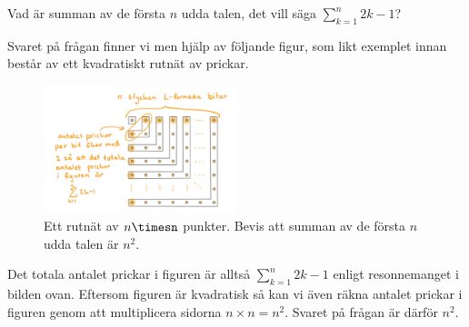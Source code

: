 \documentclass[nobib]{tufte-handout}
\begin{document}
\begin{example}
  Vad är summan av de första $n$ udda talen, det vill säga $\sum_{k=1}^n 2k-1$?
  
  Svaret på frågan finner vi men hjälp av följande figur, som likt exemplet innan består av ett kvadratiskt rutnät av prickar. 
  
  \begin{figure}[h]
    \centering
    \includegraphics[width=0.5\textwidth]{graphics/Gauss square proof.jpg}
    \caption{Ett rutnät av $n\timesn$ punkter. Bevis att summan av de första $n$ udda talen är $n^2$.}
  \end{figure}
  
  Det totala antalet prickar i figuren är alltså $\sum_{k=1}^n 2k-1$ enligt resonnemanget i bilden ovan. Eftersom figuren är kvadratisk så kan vi även räkna antalet prickar i figuren genom att multiplicera sidorna $n\times n=n^2$. Svaret på frågan är därför $n^2$. 
\end{example}
\end{document}
